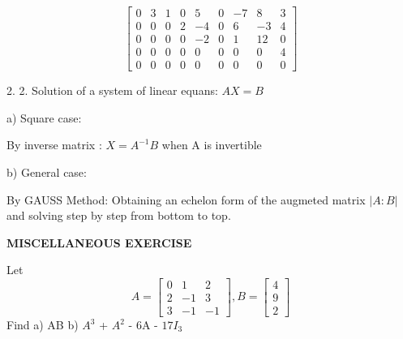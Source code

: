 \documentclass[11pt]{amsbook}
\begin{document}
\[
  \begin{bmatrix}
    0 & 3 & 1 & 0 & 5 & 0 & -7 & 8 & 3 \\
    0 & 0 & 0 & 2 & -4 & 0 & 6 & -3 & 4 \\
    0 & 0 & 0 & 0 & -2 & 0 & 1 & 12 & 0 \\
    0 & 0 & 0 & 0 & 0 & 0 & 0 & 0 & 4 \\ 
    0 & 0 & 0 & 0 & 0 & 0 & 0 & 0 & 0
  \end{bmatrix}
\]


2. 2. Solution of a system of linear equans: $AX=B$

\hspace{10mm} a) Square case:

\hspace{10mm} By inverse matrix : $X=A^{-1}B$ when A is invertible

\hspace{10mm} b) General case:

\hspace{10mm} By GAUSS Method: Obtaining an echelon form of the augmeted matrix $\mathopen|A : B\mathclose|$ and solving step by step from bottom to top.



\begin{center}
\textbf{MISCELLANEOUS EXERCISE}
\end{center}


\bigskip

\bigskip

\setcounter{exercise}{45}

\begin{exercise}
Let \[A=
  \begin{bmatrix}
    0 & 1 & 2 \\
    2 & -1 & 3 \\
    3 & -1 & -1 
  \end{bmatrix}
, B=
  \begin{bmatrix}
    4 \\
    9 \\
   2 
  \end{bmatrix}
\]
Find
a) AB \hspace{10mm}  b) $A^3$ + $A^2$ - 6A - $17I_{3}$
  
\end{exercise}

\end{document}
